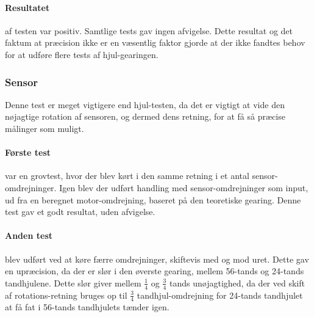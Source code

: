 \paragraph{Resultatet} af testen var positiv.
Samtlige tests gav ingen afvigelse.
Dette resultat og det faktum at præcision ikke er en væsentlig faktor gjorde at der ikke fandtes behov for at udføre flere tests af hjul-gearingen.

\subsubsection{Sensor}
Denne test er meget vigtigere end hjul-testen, da det er vigtigt at vide den nøjagtige rotation af sensoren, og dermed dens retning, for at få så præcise målinger som muligt.

\paragraph{Første test} var en grovtest, hvor der blev kørt i den samme retning i et antal sensor-omdrejninger.
Igen blev der udført handling med sensor-omdrejninger som input, ud fra en beregnet motor-omdrejning, baseret på den teoretiske gearing.
Denne test gav et godt resultat, uden afvigelse.

\paragraph{Anden test} blev udført ved at køre færre omdrejninger, skiftevis med og mod uret.
Dette gav en upræcision, da der er slør i den øverste gearing, mellem 56-tands og 24-tands tandhjulene.
Dette slør giver mellem $\frac{1}{4}$ og $\frac{3}{4}$ tands unøjagtighed, da der ved skift af rotations-retning bruges op til $\frac{3}{4}$ tandhjul-omdrejning for 24-tands tandhjulet at få fat i 56-tands tandhjulets tænder igen.
